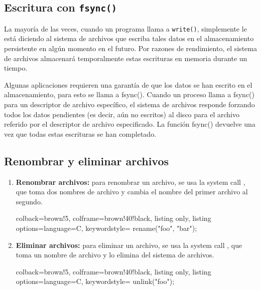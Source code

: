 \documentclass[openany]{book}
\begin{document}
\subsection{Escritura con \texttt{fsync()}}

La mayoría de las veces, cuando un programa llama a \texttt{write()}, simplemente le está diciendo al sistema de archivos que escriba tales datos en el almacenamiento persistente en algún momento en el futuro. Por razones de rendimiento, el sistema de archivos \colorbox{yellow!20}{almacenará temporalmente} estas escrituras en memoria durante un tiempo. 

Algunas aplicaciones requieren una garantía de que los datos se han escrito en el almacenamiento, para esto se llama a \colorbox{yellow!20}{fsync()}. Cuando un proceso llama a fsync() para un descriptor de archivo específico, el sistema de archivos responde forzando todos los datos pendientes (es decir, aún no escritos) al disco para el archivo referido por el descriptor de archivo especificado. La función fsync() \colorbox{yellow!20}{devuelve} una vez que todas estas escrituras \colorbox{yellow!20}{se han completado}.

\subsection{Renombrar y eliminar archivos}

\begin{enumerate}
    \item \textbf{Renombrar archivos:} para renombrar un archivo, se usa la system call , que toma dos nombres de archivo y cambia el nombre del primer archivo al segundo.
    \begin{tcblisting}{colback=brown!5, colframe=brown!40!black, listing only, listing options={language=C, keywordstyle=\color{blue!35!white}\bfseries}}
    rename("foo", "bar");
    \end{tcblisting}
    \item \textbf{Eliminar archivos:} para eliminar un archivo, se usa la system call , que toma un nombre de archivo y lo elimina del sistema de archivos.
    \begin{tcblisting}{colback=brown!5, colframe=brown!40!black, listing only, listing options={language=C, keywordstyle=\color{blue!35!white}\bfseries}}
    unlink("foo");
    \end{tcblisting}
\end{enumerate}
\end{document}
